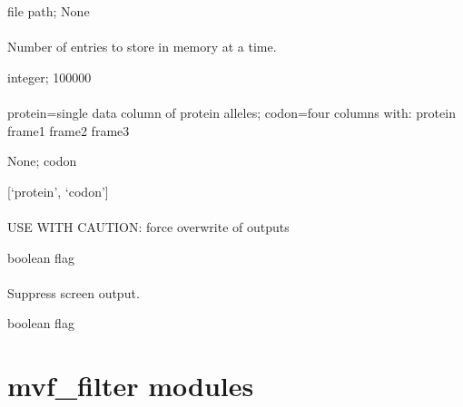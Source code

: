 \documentclass[letterpaper,11pt,english]{sphinxmanual}
\begin{document}
 file path;  None


\subsubsection{}
\label{\detokenize{prog_desc:id136}}
 Number of entries to store in memory at a time.

 integer;  100000


\subsubsection{}
\label{\detokenize{prog_desc:id137}}
 protein=single data column of protein alleles; codon=four columns with: protein frame1 frame2 frame3

 None;  codon

 {[}‘protein’, ‘codon’{]}


\subsubsection{}
\label{\detokenize{prog_desc:id138}}
 USE WITH CAUTION: force overwrite of outputs

 boolean flag


\subsubsection{}
\label{\detokenize{prog_desc:id139}}
 Suppress screen output.

 boolean flag


\chapter{mvf\_filter modules}
\label{\detokenize{mvf_filter_modules:mvf-filter-modules}}\label{\detokenize{mvf_filter_modules::doc}}
\end{document}
